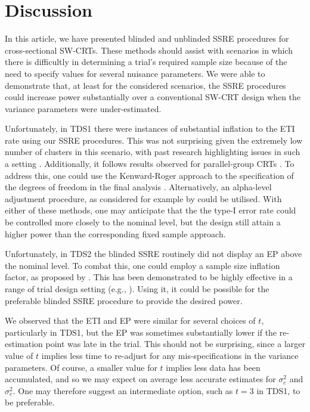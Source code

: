 \documentclass{article}
\begin{document}
\section{Discussion}\label{disc}

In this article, we have presented blinded and unblinded SSRE procedures for cross-sectional SW-CRTs. These methods should assist with scenarios in which there is difficultly in determining a trial's required sample size because of the need to specify values for several nuisance parameters. We were able to demonstrate that, at least for the considered scenarios, the SSRE procedures could increase power substantially over a conventional SW-CRT design when the variance parameters were under-estimated.

Unfortunately, in TDS1 there were instances of substantial inflation to the ETI rate using our SSRE procedures. This was not surprising given the extremely low number of clusters in this scenario, with past research highlighting issues in such a setting \citep{taljaard2016,grayling2017b}. Additionally, it follows results observed for parallel-group CRTs \citep{vanschie2014}. To address this, one could use the Kenward-Roger approach to the specification of the degrees of freedom in the final analysis \citep{kenward1997}. Alternatively, an alpha-level adjustment procedure, as considered for example by \citet{golkowski2014} could be utilised. With either of these methods, one may anticipate that the the type-I error rate could be controlled more closely to the nominal level, but the design still attain a higher power than the corresponding fixed sample approach.

Unfortunately, in TDS2 the blinded SSRE routinely did not display an EP above the nominal level. To combat this, one could employ a sample size inflation factor, as proposed by \citet{zucker1999}. This has been demonstrated to be highly effective in a range of trial design setting (e.g., \citet{friede2013,golkowski2014}). Using it, it could be possible for the preferable blinded SSRE procedure to provide the desired power.

We observed that the ETI and EP were similar for several choices of $t$, particularly in TDS1, but the EP was sometimes substantially lower if the re-estimation point was late in the trial. This should not be surprising, since a larger value of $t$ implies less time to re-adjust for any mis-specifications in the variance parameters. Of course, a smaller value for $t$ implies less data has been accumulated, and so we may expect on average less accurate estimates for $\sigma_c^2$ and $\sigma_e^2$. One may therefore suggest an intermediate option, such as $t=3$ in TDS1, to be preferable.
\end{document}
